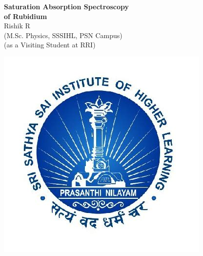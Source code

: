 \documentclass[a4paper, 12pt]{article}
\begin{document}
\begin{titlepage}
    \centering
    \vspace*{1.5cm}

    {\LARGE \textbf{Saturation Absorption Spectroscopy}}\\
    {\LARGE \textbf{of Rubidium}}\\[1.5cm]

    {\Large Rishik R}\\[0.2cm]
    {\large (M.Sc. Physics, SSSIHL, PSN Campus)}\\[0.2cm]
    {\large (as a Visiting Student at RRI)}\\[2cm]

    \begin{minipage}{0.5\textwidth}
        \centering
        \includegraphics[width=\textwidth]{sssihl.jpeg}
    \end{minipage}
    \hfill
    \begin{minipage}{0.45\textwidth}
        \centering

\end{minipage}
\end{titlepage}
\end{document}
